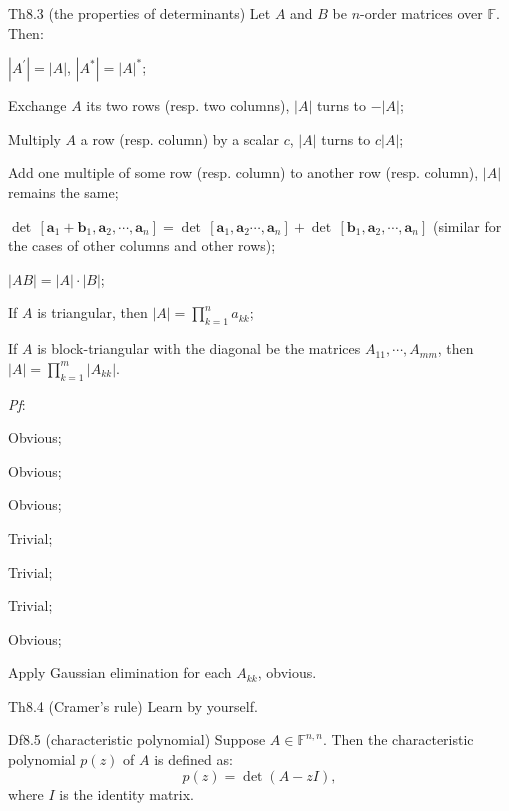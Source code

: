\documentclass{article}
\begin{document}
\begin{Th}{Th8.3 (the properties of determinants)}
    Let $A$ and $B$ be $n$-order matrices over $\mathbb{F}$. Then:
    \begin{compactenum}
        \item $|A^\prime| = |A|$, $|A^\ast| = |A|^\ast$;
        \item Exchange $A$ its two rows (resp. two columns), $|A|$ turns to $-|A|$;
        \item Multiply $A$ a row (resp. column) by a scalar $c$, $|A|$ turns to $c|A|$;
        \item Add one multiple of some row (resp. column) to another row (resp. column), $|A|$ remains the same;
        \item $\det\, [\pmb{a}_1 + \pmb{b}_1, \pmb{a}_2,\cdots, \pmb{a}_n] = \det\,[\pmb{a}_1, \pmb{a}_2\cdots,\pmb{a}_n] + \det\,[\pmb{b}_1,\pmb{a}_2,\cdots,\pmb{a}_n]$ (similar for the cases of other columns and other rows);
        \item $|AB| = |A|\cdot |B|$;
        \item If $A$ is triangular, then $|A| = \prod_{k=1}^{n} a_{kk}$;
        \item If $A$ is block-triangular with the diagonal be the matrices $A_{11}, \cdots, A_{mm}$, then $|A| = \prod_{k=1}^{m} |A_{kk}|$.
    \end{compactenum}
    \tcblower
    \textit{Pf}: 
    \begin{compactenum}
        \item Obvious;
        \item Obvious;
        \item Obvious;
        \item Trivial;
        \item Trivial;
        \item Trivial;
        \item Obvious;
        \item Apply Gaussian elimination for each $A_{kk}$, obvious.
    \end{compactenum}
\end{Th}

\begin{Th}{Th8.4 (Cramer's rule)}
    Learn by yourself.
\end{Th}

\begin{Df}{Df8.5 (characteristic polynomial)}
    Suppose $A\in\mathbb{F}^{n,n}$. Then the characteristic polynomial $p(z)$ of $A$ is defined as:
    $$ p(z) = \det (A-zI), $$
    where $I$ is the identity matrix.
\end{Df}
\end{document}

